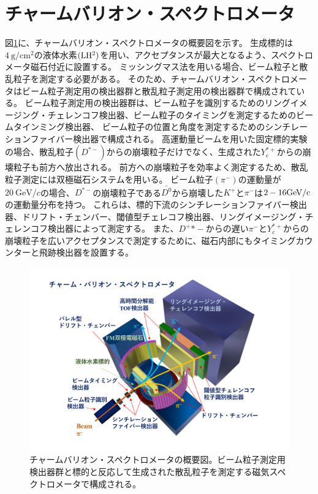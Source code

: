 \section{チャームバリオン・スペクトロメータ}
図\ref{spectrometer}に、チャームバリオン・スペクトロメータの概要図を示す。
生成標的は$\SI{4}{\g / \cm^2}$の液体水素$(\rm{LH^2})$を用い、アクセプタンスが最大となるよう、スペクトロメータ磁石付近に設置する。
ミッシングマス法を用いる場合、ビーム粒子と散乱粒子を測定する必要がある。
そのため、チャームバリオン・スペクトロメータはビーム粒子測定用の検出器群と散乱粒子測定用の検出器群で構成されている。
ビーム粒子測定用の検出器群は、ビーム粒子を識別するためのリングイメージング・チェレンコフ検出器、ビーム粒子のタイミングを測定するためのビームタインミング検出器、
ビーム粒子の位置と角度を測定するためのシンチレーションファイバー検出器で構成される。
高運動量ビームを用いた固定標的実験の場合、散乱粒子$(D^{*-})$からの崩壊粒子だけでなく、生成された$Y_c^{*+}$からの崩壊粒子も前方へ放出される。
前方への崩壊粒子を効率よく測定するため、散乱粒子測定には双極磁石システムを用いる。
ビーム粒子$(\pi^-)$の運動量が$\SI{20}{\GeV/c}$の場合、$D^{*-}$の崩壊粒子である$\bar{D^0}$から崩壊した$K^+$と$\pi^-$は$2-16\space\si{\GeV/c}$の運動量分布を持つ。
これらは、標的下流のシンチレーションファイバー検出器、ドリフト・チェンバー、閾値型チェレコフ検出器、リングイメージング・チェレンコフ検出器によって測定する。
また、$D^+{*-}$からの遅い$\pi^-$と$Y_c^{*+}$からの崩壊粒子を広いアクセプタンスで測定するために、磁石内部にもタイミングカウンターと飛跡検出器を設置する。


\begin{figure}[htbp]
  \label{spectrometer}
  \centering
  \includegraphics[width=15cm]{images/chapter1/spectrometer.pdf}
  \caption{チャームバリオン・スペクトロメータの概要図。ビーム粒子測定用検出器群と標的と反応して生成された散乱粒子を測定する磁気スペクトロメータで構成される。}
\end{figure}